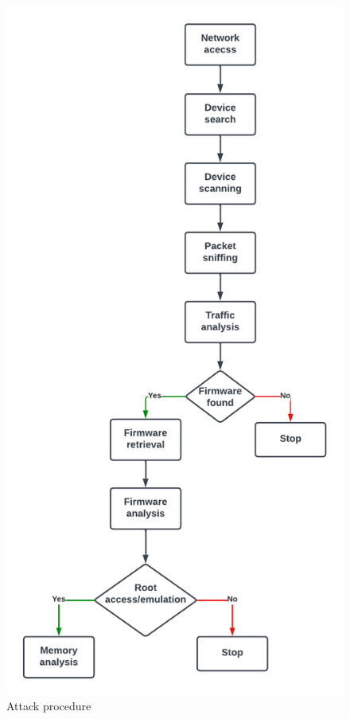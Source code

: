 \begin{figure}[h]
    \centering
    \includegraphics[scale=0.34]{Attack_procedure.png}
    \caption{Attack procedure}
    \label{fig:attack_procedure}
\end{figure}
\newpage